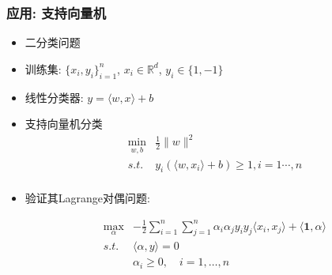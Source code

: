 \documentclass[handout,10pt]{beamer}
\begin{document}




\begin{frame}
  \frametitle{应用: 支持向量机}

  \begin{itemize}
    \item 二分类问题
    \item 训练集: $\{x_i,y_i\}_{i=1}^{n}$, $x_i \in \mathbb{R}^d$, $y_i \in \{1,-1\}$

    \item 线性分类器: $y  = \langle w,x\rangle +b$
    
    \item 支持向量机分类 
    $$
       \begin{array}{cl}
         \min_{w,b} & \frac{1}{2}\|w\|^2 \\
         s.t.  & y_i (\langle w,x_i\rangle +b) \geq 1, i=1\cdots,n\\
       \end{array}
      $$ 
      
    \item 验证其Lagrange对偶问题: 
    
        $$
       \begin{array}{cl}
         \max_{\alpha} & -\frac{1}{2}\sum_{i=1}^n \sum_{j=1}^n \alpha_i\alpha_j y_iy_j \langle x_i,x_j\rangle + \langle \mathbf{1},\alpha\rangle \\
         s.t.  & \langle \alpha,y\rangle = 0\\
            & \alpha_i \geq 0, \quad i=1,\dots,n\\
       \end{array}
      $$ 
  \end{itemize}

\end{frame}
\end{document}
